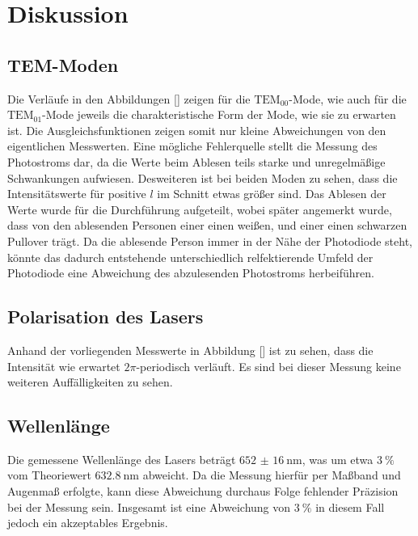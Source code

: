 \section{Diskussion}
\label{sec:Diskussion}

\subsection{TEM-Moden}

Die Verläufe in den Abbildungen [] zeigen für die $\text{TEM}_{00}$-Mode, wie auch für die $\text{TEM}_{01}$-Mode jeweils
die charakteristische Form der Mode, wie sie zu erwarten ist. Die Ausgleichsfunktionen zeigen somit nur kleine Abweichungen von den 
eigentlichen Messwerten. Eine mögliche Fehlerquelle stellt die Messung des Photostroms dar, da die Werte beim Ablesen teils starke und 
unregelmäßige Schwankungen aufwiesen. Desweiteren ist bei beiden Moden zu sehen, dass die Intensitätswerte für positive $l$ im Schnitt etwas 
größer sind. Das Ablesen der Werte wurde für die Durchführung aufgeteilt, wobei später angemerkt wurde, dass von den ablesenden Personen 
einer einen weißen, und einer einen schwarzen Pullover trägt. Da die ablesende Person immer in der Nähe der Photodiode steht, könnte das dadurch
entstehende unterschiedlich relfektierende Umfeld der Photodiode eine Abweichung des abzulesenden Photostroms herbeiführen. 

\subsection{Polarisation des Lasers}

Anhand der vorliegenden Messwerte in Abbildung [] ist zu sehen, dass die Intensität wie erwartet $2\pi$-periodisch verläuft. Es sind bei dieser 
Messung keine weiteren Auffälligkeiten zu sehen. 

\subsection{Wellenlänge}

Die gemessene Wellenlänge des Lasers beträgt $\SI{652(16)}{\nano\m}$, was um etwa $\SI{3}{\percent}$ vom Theoriewert $\SI{632.8}{\nano\m}$ 
abweicht. Da die Messung hierfür per Maßband und Augenmaß erfolgte, kann diese Abweichung durchaus Folge fehlender Präzision bei der Messung sein. 
Insgesamt ist eine Abweichung von $\SI{3}{\percent}$ in diesem Fall jedoch ein akzeptables Ergebnis. 